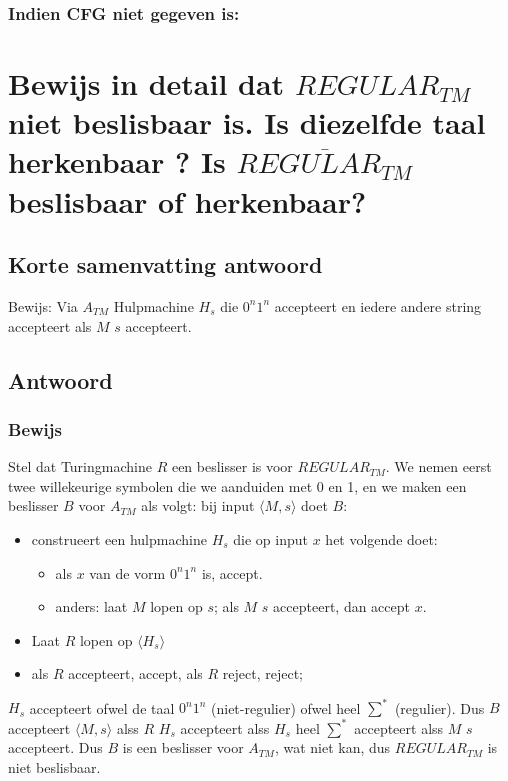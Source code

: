 \documentclass{article}
\begin{document}
        \subsubsection{Indien CFG niet gegeven is:}

\newpage
\section{Bewijs in detail dat  $REGULAR_{TM}$ niet beslisbaar is. Is diezelfde taal herkenbaar ? Is $\overline{REGULAR_{TM}}$ beslisbaar of herkenbaar?}
    \subsection{Korte samenvatting antwoord}
        Bewijs: Via $A_{TM}$ Hulpmachine $H_s$ die $0^n1^n$ accepteert en iedere andere string accepteert als $M$ $s$ accepteert.
    \subsection{Antwoord}
        \subsubsection{Bewijs}
            Stel dat Turingmachine $R$ een beslisser is voor $REGULAR_{TM}$. We nemen eerst twee willekeurige symbolen die we aanduiden met 0 en 1, en we maken een beslisser $B$ voor $A_{TM}$ als volgt: bij input $\langle M, s \rangle $ doet $B$:
            \begin{itemize}
                \item construeert een hulpmachine $H_s$ die op input $x$ het volgende doet:
                \begin{itemize}
                    \item als $x$ van de vorm $0^n1^n$ is, accept.
                    \item anders: laat $M$ lopen op $s$; als $M$ $s$ accepteert, dan accept $x$.
                \end{itemize}
                \item Laat $R$ lopen op $\langle H_s \rangle$
                \item als $R$ accepteert, accept, als $R$ reject, reject;
            \end{itemize}
            $H_s$ accepteert ofwel de taal $0^n1^n$ (niet-regulier) ofwel heel $\sum^*$ (regulier). Dus $B$ accepteert $\langle M,s \rangle$ alss $R$ $H_s$ accepteert alss $H_s$ heel $\sum^*$ accepteert alss $M$ $s$ accepteert. Dus $B$ is een beslisser voor $A_{TM}$, wat niet kan, dus $REGULAR_{TM}$ is niet beslisbaar.
\end{document}
